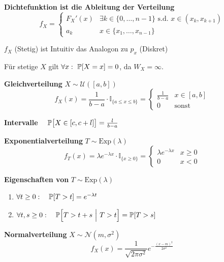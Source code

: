 \theorem \textbf{Dichtefunktion ist die Ableitung der Verteilung}
$$
    f_X = \begin{cases}
        F_X'(x) & \exists k \in \{0,\ldots,n-1\} \text{ s.d. } x \in (x_k,x_{k+1}) \\
        a_k     & x \in \{x_1,\ldots,x_{n-1}\}
    \end{cases}
$$

{\scriptsize
    \remark $f_X$ (Stetig) ist Intuitiv das Analogon zu $p_x$ (Diskret)

    \remark Für stetige $X$ gilt $\forall x:\ \P[X=x] = 0$, da $W_X = \infty$.
}

 \textbf{Gleichverteilung} $X \sim \mathcal{U}([a,b])$\\
$$
    f_X(x) = \frac{1}{b-a}\cdot\mathbb{I}_{\{a\leq x \leq b\}} = \begin{cases}
        \frac{1}{b-a}   & x \in [a,b] \\
        0               & \text{sonst}
    \end{cases}
$$

\lemma \textbf{Intervalle} $\quad \P\bigl[ X \in [c, c+l] \bigr] = \frac{l}{b-a}$\\


 \textbf{Exponentialverteilung} $T \sim \text{Exp}(\lambda)$
$$
    f_T(x) = \lambda e^{-\lambda x} \cdot \mathbb{I}_{\{x \geq 0 \}} = \begin{cases}
        \lambda e^{-\lambda x}  & x \geq 0 \\
        0                       & x < 0
    \end{cases}
$$

\lemma \textbf{Eigenschaften von} $T \sim \text{Exp}(\lambda)$
\begin{enumerate}
    \item $\forall t \geq 0:\quad \P[T > t] = e^{-\lambda t}$
    \item $\forall t,s \geq 0:\quad \P\Bigl[ T > t+s\ \Big|\ T > t \Bigr] = \P[T>s]$ 
\end{enumerate}

\newpage

 \textbf{Normalverteilung} $X \sim \mathcal{N}(m, \sigma^2)$
$$
    f_X(x) = \frac{1}{ \sqrt{2\pi\sigma^2} } e^{ -\frac{(x-m)^2}{2\sigma^2} }
$$

